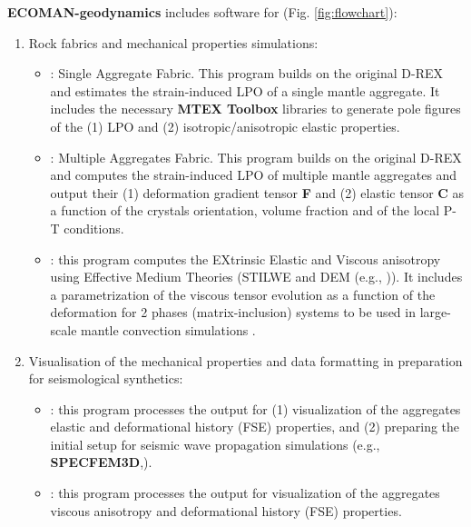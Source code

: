 \textbf{ECOMAN-geodynamics} includes software for (Fig. \ref{fig:flowchart}):
\begin{enumerate}
\item Rock fabrics and mechanical properties simulations:

\begin{itemize}
    \item \textbf{\drexstitle}: Single Aggregate Fabric. This program builds on the original D-REX and estimates the strain-induced LPO of a single mantle aggregate. It includes the necessary \textbf{MTEX Toolbox} libraries to generate pole figures of the (1) LPO and (2) isotropic/anisotropic elastic properties.

    \item \textbf{\drexmtitle}: Multiple Aggregates Fabric. This program builds on the original D-REX and computes the strain-induced LPO of multiple mantle aggregates and output their (1) deformation gradient tensor \textbf{F} and (2) elastic tensor \textbf{C} as a function of the crystals orientation, volume fraction and of the local P-T conditions. 

    \item \textbf{\exevtitle}: this program computes the EXtrinsic Elastic and Viscous anisotropy using Effective Medium Theories (STILWE \citep{backus1962jgr} and DEM (e.g., \citep{mainprice1997tect})). It includes a parametrization of the viscous tensor evolution as a function of the deformation for 2 phases (matrix-inclusion) systems to be used in large-scale mantle convection simulations \citep{demontserrat2021}.


\end{itemize}

\item Visualisation of the mechanical properties and data formatting in preparation for seismological synthetics:

\begin{itemize}
    \item \textbf{\viztomotitle}: this program processes the \drexmtitle{} output for (1) visualization of the aggregates elastic and deformational history (FSE) properties, and (2) preparing the initial setup for seismic wave propagation simulations (e.g., \textbf{SPECFEM3D},\psitomotitle).
    
    \item \vizvisctitle: this program processes the \drexmtitle{} output for visualization of the aggregates viscous anisotropy and deformational history (FSE) properties.
\end{itemize}

\end{enumerate}

